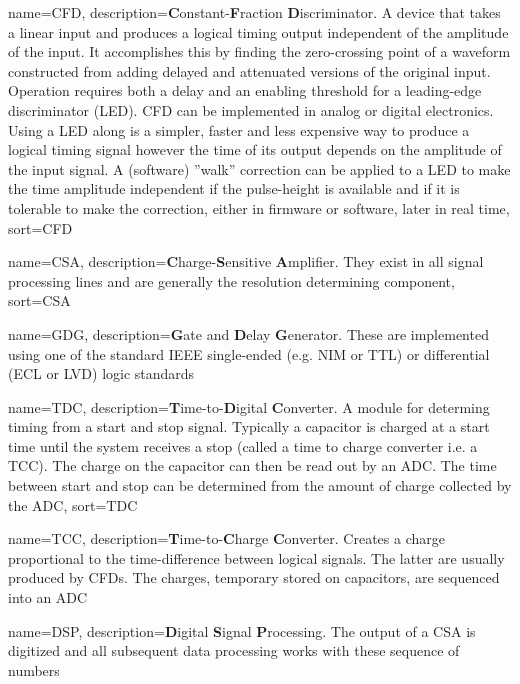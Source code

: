 {
  name=CFD,
  description={\textbf{C}onstant-\textbf{F}raction \textbf{D}iscriminator. A device that takes a linear input and produces a logical timing output independent of the amplitude of the input. It accomplishes this by finding the zero-crossing point of a waveform constructed from adding delayed and attenuated versions of the original input. Operation requires both a delay and an enabling threshold for a leading-edge discriminator (LED). CFD can be implemented in analog or digital electronics.  Using a LED along is a simpler, faster and less expensive way to produce a logical timing signal however the time of its output depends on the amplitude of the input signal. A (software) ”walk” correction can be applied to a LED to make the time amplitude independent if the pulse-height is available and if it is tolerable to make the correction, either in firmware or software, later in real time},
  sort={CFD}
}

{
  name=CSA,
  description={\textbf{C}harge-\textbf{S}ensitive \textbf{A}mplifier. They exist in all signal processing lines and are generally the resolution determining component},
  sort={CSA}
 }

{
  name=GDG,
  description={\textbf{G}ate and \textbf{D}elay \textbf{G}enerator. These are implemented using  one of the standard IEEE single-ended (e.g. NIM or TTL) or differential (ECL or LVD) logic standards}
 }

{
  name=TDC,
  description={\textbf{T}ime-to-\textbf{D}igital \textbf{C}onverter. A module for determing timing from a start and stop signal. Typically a capacitor is charged at a start time until the system receives a stop (called a time to charge converter i.e. a TCC). The charge on the capacitor can then be read out by an ADC. The time between start and stop can be determined from the amount of charge collected by the ADC},
  sort={TDC}
 }

 {
     name=TCC,
     description={\textbf{T}ime-to-\textbf{C}harge \textbf{C}onverter. Creates a charge proportional to the time-difference between logical signals. The latter are usually produced by CFDs. The charges, temporary stored on capacitors, are sequenced into an ADC}
 }

{
  name=DSP,
  description={\textbf{D}igital \textbf{S}ignal \textbf{P}rocessing. The output of a CSA is digitized and all subsequent data processing works with these sequence of numbers}
 }

